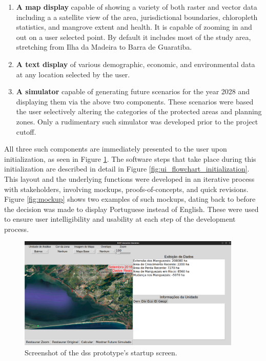 \begin{enumerate}[label=\emph{\alph*},itemsep=0pt,parsep=0pt]
	\item{\textbf{A map display} capable of showing a variety of both raster and vector data including a a satellite view of the area, jurisdictional boundaries, chloropleth statistics, and mangrove extent and health. It is capable of zooming in and out on a user selected point. By default it includes most of the study area, stretching from Ilha da Madeira to Barra de Guaratiba.}
	\item{\textbf{A text display} of various demographic, economic, and environmental data at any location selected by the user.}
	\item{\textbf{A simulator} capable of generating future scenarios for the year 2028 and displaying them via the above two components. These scenarios were based the user selectively altering the categories of the protected areas and planning zones. Only a rudimentary such simulator was developed prior to the project cutoff.}
\end{enumerate}

All three such components are immediately presented to the user upon initialization, as seen in Figure \ref{fig:rio-dss-startup-screenshot}. The software steps that take place during this initialization are described in detail in Figure \ref{fig:ui_flowchart_initialization}. This layout and the underlying functions were developed in an iterative process with stakeholders, involving mockups, proofs-of-concepts, and quick revisions. Figure \ref{fig:mockup} shows two examples of such mockups, dating back to before the decision was made to display Portuguese instead of English. These were used to ensure user intelligibility and usability at each step of the development process. 

\begin{figure}[!htb] 
\centering
\includegraphics[width=0.95\textwidth]{Figures/chap4/rio-dss-startup-screenshot.png}
\caption[Screenshot of Startup Screen of the Rio de Janeiro DSS]{Screenshot of the \ac{dss} prototype's startup screen.}
\label{fig:rio-dss-startup-screenshot}
\end{figure}

